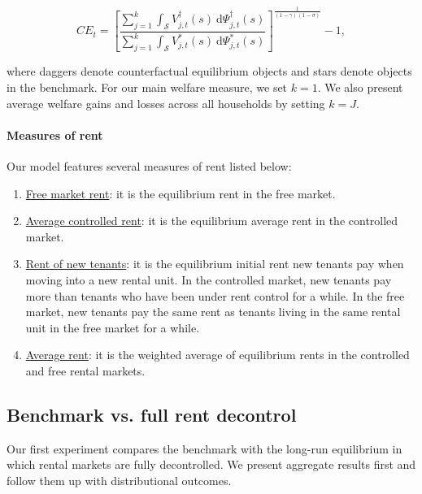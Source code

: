 \documentclass[parskip=full]{article}
\begin{document}
\begin{equation*}
  CE_{t} = \left[\frac{\sum_{j=1}^{k}\int_{\mathcal{S}}V^{\dagger}_{j,t}(s)\ \mathrm{d}\Psi^{\dagger}_{j,t}(s)}{\sum_{j=1}^{k}\int_{\mathcal{S}}V^*_{j,t}(s)\ \mathrm{d}\Psi^*_{j,t}(s)}\right]^{\frac{1}{(1-\gamma)(1-\sigma)}}-1,
\end{equation*}

\noindent where daggers denote counterfactual equilibrium objects and stars denote objects in the benchmark. For our main welfare measure, we set $k=1$. We also present average welfare gains and losses across all households by setting $k=J$.

\paragraph{Measures of rent} Our model features several measures of rent listed below: 

\begin{enumerate}
    \item \underline{Free market rent}: it is the equilibrium rent in the free market.
    \item \underline{Average controlled rent}: it is the equilibrium average rent in the controlled market.
    \item \underline{Rent of new tenants}: it is the equilibrium initial rent new tenants pay when moving into a new rental unit. In the controlled market, new tenants pay more than tenants who have been under rent control for a while. In the free market, new tenants pay the same rent as tenants living in the same rental unit in the free market for a while.
    \item \underline{Average rent}: it is the weighted average of equilibrium rents in the controlled and free rental markets.
\end{enumerate}

\subsection{Benchmark vs. full rent decontrol}\label{subsection:full_decontrol}
Our first experiment compares the benchmark with the long-run equilibrium in which rental markets are fully decontrolled. We present aggregate results first and follow them up with distributional outcomes.
\end{document}
